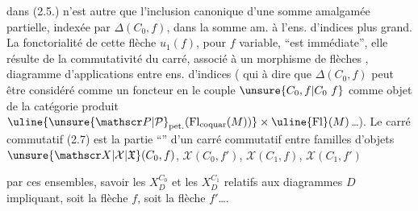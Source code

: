 dans (2.5.) n'est autre que l'inclusion canonique d'une somme amalgamée partielle, indexée par $\Delta(C_0,f)$, dans la somme am.  à l'ens. d'indices plus grand. La fonctorialité de cette flèche $u_1(f)$, pour $f$ variable, ``est immédiate'', elle résulte de la commutativité du carré, associé à un  morphisme  de flèches
,   diagramme d'applications entre ens. d'indices
(   qui  à dire que $\Delta(C_0,f)$ peut être considéré comme un foncteur en le couple $\unsure{C_0,f|C_0\ f}$  comme objet de la catégorie produit $\uline{\unsure{\mathscr P|\mathcal P}_{\mathrm{pet.}}(\mathrm{Fl}_{\mathrm{coquar}}(M))}\times\uline{\mathrm{Fl}}(M)$\ldots). Le carré commutatif (2.7) est la partie ``'' d'un carré commutatif entre familles d'objets $\unsure{\mathscr X|\mathcal X|\mathfrak X}(C_0,f)$, $\mathscr X(C_0,f')$, $\mathscr X(C_1,f)$, $\mathscr X(C_1,f')$

 par ces ensembles, savoir les $X_D^{C_0}$ et les $X_D^{C_1}$ relatifs aux diagrammes $D$ impliquant, soit la flèche $f$, soit la flèche $f'$\ldots.

